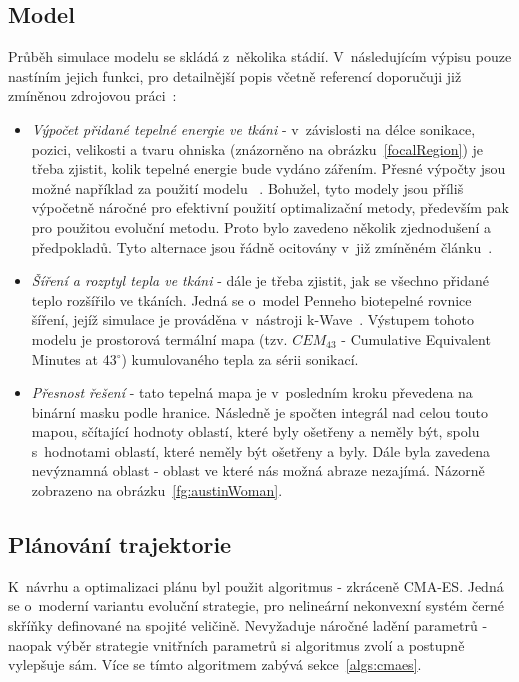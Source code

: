 \subsection*{Model} 
Průběh simulace modelu se skládá z~několika stádií. V~následujícím výpisu pouze nastíním jejich funkci, pro detailnější popis včetně referencí doporučuji již zmíněnou zdrojovou práci~\cite{FITPUB11696}:
\begin{itemize}
    \item \textit{Výpočet přidané tepelné energie ve tkáni} - v~závislosti na délce sonikace, pozici, velikosti a tvaru ohniska (znázorněno na obrázku~\ref{focalRegion}) je třeba zjistit, kolik tepelné energie bude vydáno zářením. Přesné výpočty jsou možné například za použití modelu ~\cite{HIFUPropagation}. Bohužel, tyto modely jsou příliš výpočetně náročné pro efektivní použití optimalizační metody, především pak pro použitou evoluční metodu. Proto bylo zavedeno několik zjednodušení a předpokladů. Tyto alternace jsou řádně ocitovány v~již zmíněném článku~\cite{FITPUB11696}.
    \item \textit{Šíření a rozptyl tepla ve tkáni} - dále je třeba zjistit, jak se všechno přidané teplo rozšířilo ve tkáních. Jedná se o~model Penneho biotepelné rovnice šíření, jejíž simulace je prováděna v~nástroji k-Wave~\cite{HIFUTHERMALMODEL}. Výstupem tohoto modelu je prostorová termální mapa (tzv. $CEM_{43}$ - Cumulative Equivalent Minutes at 43$^{\circ}$) kumulovaného tepla za sérii sonikací.
    \item \textit{Přesnost řešení}  - tato tepelná mapa je v~posledním kroku převedena na binární masku podle hranice. Následně je spočten integrál nad celou touto mapou, sčítající hodnoty oblastí, které byly ošetřeny a neměly být, spolu s~hodnotami oblastí, které neměly být ošetřeny a byly. Dále byla zavedena nevýznamná oblast - oblast ve které nás možná abraze nezajímá. Názorně zobrazeno na obrázku~\ref{fg:austinWoman}.
\end{itemize}

\subsection*{Plánování trajektorie}
K~návrhu a optimalizaci plánu byl použit algoritmus  - zkráceně CMA-ES. Jedná se o~moderní variantu evoluční strategie, pro nelineární nekonvexní systém černé skříňky definované na spojité veličině. Nevyžaduje náročné ladění parametrů - naopak výběr strategie vnitřních parametrů si algoritmus zvolí a postupně vylepšuje sám. Více se tímto algoritmem zabývá sekce~\ref{algs:cmaes}.

